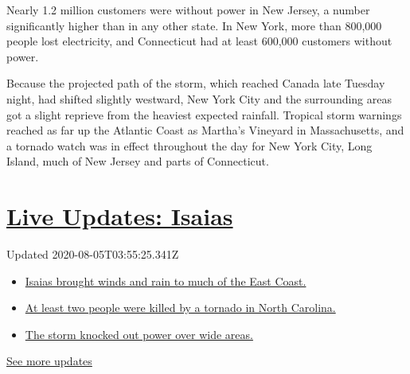 Nearly 1.2 million customers were without power in New Jersey, a number
significantly higher than in any other state. In New York, more than
800,000 people lost electricity, and Connecticut had at least 600,000
customers without power.

Because the projected path of the storm, which reached Canada late
Tuesday night, had shifted slightly westward, New York City and the
surrounding areas got a slight reprieve from the heaviest expected
rainfall. Tropical storm warnings reached as far up the Atlantic Coast
as Martha's Vineyard in Massachusetts, and a tornado watch was in effect
throughout the day for New York City, Long Island, much of New Jersey
and parts of Connecticut.

\hypertarget{live-updates-isaias}{%
\section{\texorpdfstring{\href{https://www.nytimes3xbfgragh.onion/2020/08/04/us/isaias-storm-updates.html?action=click\&pgtype=Article\&state=default\&region=MAIN_CONTENT_1\&context=storylines_live_updates}{Live
Updates: Isaias}}{Live Updates: Isaias}}\label{live-updates-isaias}}

Updated 2020-08-05T03:55:25.341Z

\begin{itemize}
\tightlist
\item
  \href{https://www.nytimes3xbfgragh.onion/2020/08/04/us/isaias-storm-updates.html?action=click\&pgtype=Article\&state=default\&region=MAIN_CONTENT_1\&context=storylines_live_updates\#link-38d68049}{Isaias
  brought winds and rain to much of the East Coast.}
\item
  \href{https://www.nytimes3xbfgragh.onion/2020/08/04/us/isaias-storm-updates.html?action=click\&pgtype=Article\&state=default\&region=MAIN_CONTENT_1\&context=storylines_live_updates\#link-7961bdbc}{At
  least two people were killed by a tornado in North Carolina.}
\item
  \href{https://www.nytimes3xbfgragh.onion/2020/08/04/us/isaias-storm-updates.html?action=click\&pgtype=Article\&state=default\&region=MAIN_CONTENT_1\&context=storylines_live_updates\#link-3480f4a1}{The
  storm knocked out power over wide areas.}
\end{itemize}

\href{https://www.nytimes3xbfgragh.onion/2020/08/04/us/isaias-storm-updates.html?action=click\&pgtype=Article\&state=default\&region=MAIN_CONTENT_1\&context=storylines_live_updates}{See
more updates}

